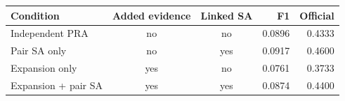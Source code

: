 \begin{tabular}{lccrr}
\toprule
Condition & Added evidence & Linked SA & F1 & Official \\
\midrule
Independent PRA & no & no & 0.0896 & 0.4333 \\
Pair SA only & no & yes & 0.0917 & 0.4600 \\
Expansion only & yes & no & 0.0761 & 0.3733 \\
Expansion + pair SA & yes & yes & 0.0874 & 0.4400 \\
\bottomrule
\end{tabular}
